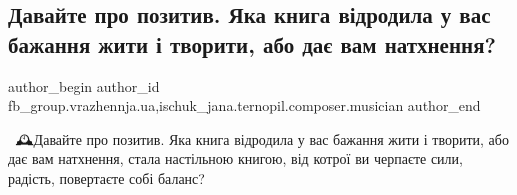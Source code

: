  
 
 
 
 

\subsection{Давайте про позитив. Яка книга відродила у вас бажання жити і творити, або дає вам натхнення?}
\label{sec:07_02_2023.fb.fb_group.vrazhennja.ua.1.davaite_pro_pozitiv_}
 
\ifcmt
 author_begin
   author_id fb_group.vrazhennja.ua,ischuk_jana.ternopil.composer.musician
 author_end
\fi

🌹📖🕰️Давайте про позитив. Яка книга відродила у вас бажання жити і творити,
або дає вам натхнення, стала настільною книгою, від котрої ви черпаєте сили,
радість, повертаєте собі баланс?

